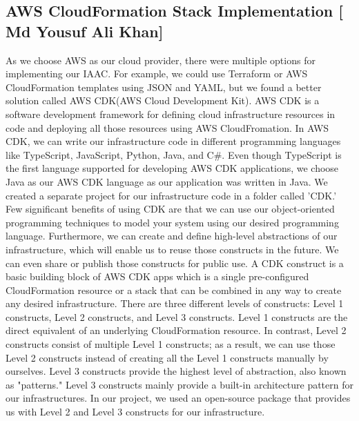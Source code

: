 \subsection{AWS CloudFormation Stack Implementation [ Md Yousuf Ali Khan]}\label{sec:aws-cloudformation-stack}
As we choose AWS as our cloud provider, there were multiple options for implementing our IAAC. For example, we could use Terraform or AWS CloudFormation templates using JSON and YAML, but we found a better solution called AWS CDK(AWS Cloud Development Kit). AWS CDK is a software development framework for defining cloud infrastructure resources in code and deploying all those resources using AWS CloudFromation. In AWS CDK, we can write our infrastructure code in different programming languages like TypeScript, JavaScript, Python, Java, and C#. Even though TypeScript is the first language supported for developing AWS CDK applications, we choose Java as our AWS CDK language as our application was written in Java. We created a separate project for our infrastructure code in a folder called 'CDK.' Few significant benefits of using CDK are that we can use our object-oriented programming techniques to model your system using our desired programming language.
Furthermore, we can create and define high-level abstractions of our infrastructure, which will enable us to reuse those constructs in the future. We can even share or publish those constructs for public use.  A CDK construct is a basic building block of AWS CDK apps which is a single pre-configured CloudFormation resource or a stack that can be combined in any way to create any desired infrastructure. There are three different levels of constructs: Level 1 constructs, Level 2 constructs, and Level 3 constructs. Level 1 constructs are the direct equivalent of an underlying CloudFormation resource.
In contrast, Level 2 constructs consist of multiple Level 1 constructs; as a result, we can use those Level 2 constructs instead of creating all the Level 1 constructs manually by ourselves. Level 3 constructs provide the highest level of abstraction, also known as "patterns." Level 3 constructs mainly provide a built-in architecture pattern for our infrastructures. In our project, we used an open-source package that provides us with Level 2 and Level 3 constructs for our infrastructure. 

